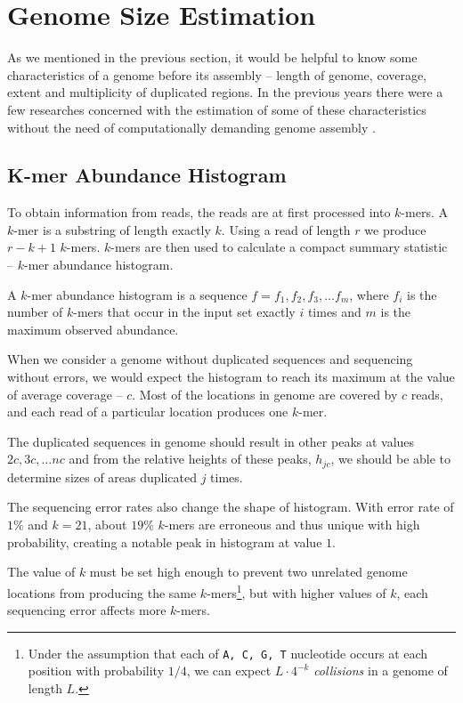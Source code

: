 \section{Genome Size Estimation}
As we mentioned in the previous section, it would be helpful to know some characteristics of a genome before its assembly -- 
length of genome, coverage, extent and multiplicity of duplicated regions. In the previous years there were a few
researches concerned with the estimation of some of these characteristics without the need of computationally demanding 
genome assembly \cite{Hozza2015, Melsted2014, Sivadasan2016}. 

\subsection{K-mer Abundance Histogram}
\label{sec:histogram}
To obtain information from reads, the reads are at first processed into $k$-mers. A $k$-mer is a substring of length exactly $k$.
Using a read of length $r$ we produce $r-k+1$ $k$-mers. $k$-mers are then used to calculate a compact summary statistic -- $k$-mer 
abundance histogram. 

\begin{definition}
A $k$-mer abundance histogram is a sequence $f = f_1, f_2, f_3, \dots f_m$, where $f_i$ is the number of $k$-mers that occur in
the input set exactly $i$ times and $m$ is the maximum observed abundance.
\end{definition}

When we consider a genome without duplicated sequences and sequencing without errors, we would expect the histogram
to reach its maximum at the value of average coverage -- $c$. Most of the locations in genome are covered by $c$ reads,
and each read of a particular location produces one $k$-mer.

The duplicated sequences in genome should result in other peaks at values $2c, 3c, \dots nc$ and from the relative heights of these peaks, $h_{jc}$,
we should be able to determine sizes of areas duplicated $j$ times.

The sequencing error rates also change the shape of histogram. With error rate of $1\%$ and $k=21$, about $19\%$ $k$-mers are
erroneous and thus unique with high probability, creating a notable peak in histogram at value $1$. 

The value of $k$ must be set high enough to prevent two unrelated genome locations from producing the same $k$-mers\footnote{Under
the assumption that each of \texttt{A, C, G, T} nucleotide occurs at each position with probability $1/4$, we can expect
$L \cdot 4^{-k}$ \textit{collisions} in a genome of length $L$.}, but with higher values of $k$, each sequencing error affects more $k$-mers.

